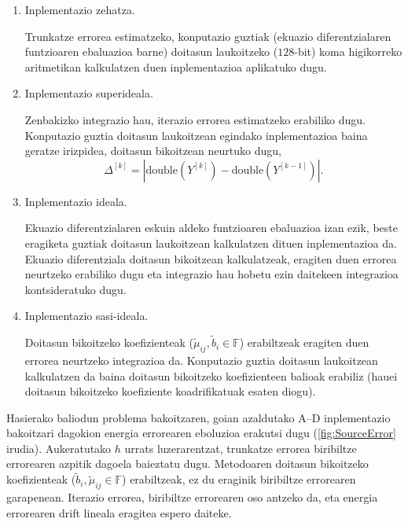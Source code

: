 \begin{enumerate}
\renewcommand{\theenumi}{\Alph{enumi}}

\item Inplementazio zehatza.

Trunkatze errorea estimatzeko, konputazio guztiak (ekuazio diferentzialaren funtzioaren ebaluazioa barne) doitasun laukoitzeko ($128$-bit) koma higikorreko aritmetikan kalkulatzen duen inplementazioa aplikatuko dugu. 


\item Inplementazio superideala.

Zenbakizko integrazio hau, iterazio errorea estimatzeko erabiliko dugu. Konputazio guztia doitasun laukoitzean egindako inplementazioa baina geratze irizpidea, doitasun bikoitzean neurtuko dugu,
\begin{equation*}
\Delta^{[k]}=|\text{double}(Y^{[k]})-\text{double}(Y^{[k-1]})|.
\end{equation*}

\item Inplementazio ideala.

Ekuazio diferentzialaren eskuin aldeko funtzioaren ebaluazioa izan ezik, beste eragiketa guztiak doitasun laukoitzean kalkulatzen dituen inplementazioa da. Ekuazio diferentziala doitasun bikoitzean kalkulatzeak, eragiten duen errorea neurtzeko erabiliko dugu eta integrazio hau hobetu ezin daitekeen integrazioa kontsideratuko dugu.  

\item Inplementazio sasi-ideala.

Doitasun bikoitzeko koefizienteak ($\tilde{\mu}_{ij},\tilde{b}_i \in \mathbb{F}$) erabiltzeak eragiten duen errorea neurtzeko integrazioa da. Konputazio guztia doitasun laukoitzean kalkulatzen da baina doitasun bikoitzeko koefizienteen balioak erabiliz (hauei doitasun bikoitzeko koefiziente koadrifikatuak esaten diogu). 

\end{enumerate}


Hasierako baliodun problema bakoitzaren, goian azaldutako A--D inplementazio bakoitzari dagokion energia errorearen eboluzioa erakutsi dugu (\ref{fig:SourceError} irudia). Aukeratutako $h$ urrats luzerarentzat, trunkatze errorea biribiltze errorearen azpitik dagoela baieztatu dugu.
Metodoaren doitasun bikoitzeko koefizienteak ($\tilde{b}_i, \tilde{\mu}_{ij}\in \mathbb{F}$) erabiltzeak, ez du eraginik biribiltze errorearen garapenean.  Iterazio errorea, biribiltze errorearen oso antzeko da, eta energia errorearen drift lineala eragitea espero daiteke. 

